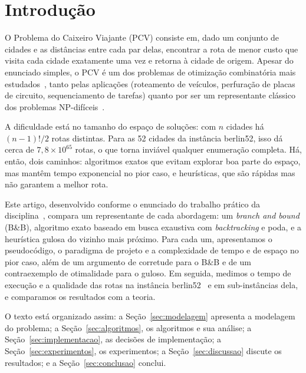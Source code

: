 \documentclass[12pt,a4paper]{article}
\begin{document}
\section{Introdução}

O Problema do Caixeiro Viajante (PCV) consiste em, dado um conjunto de cidades e as distâncias entre cada par delas, encontrar a rota de menor custo que visita cada cidade exatamente uma vez e retorna à cidade de origem. Apesar do enunciado simples, o PCV é um dos problemas de otimização combinatória mais estudados~\cite{applegate2006}, tanto pelas aplicações (roteamento de veículos, perfuração de placas de circuito, sequenciamento de tarefas) quanto por ser um representante clássico dos problemas NP-difíceis~\cite{karp1972,garey1979}.

A dificuldade está no tamanho do espaço de soluções: com $n$ cidades há $(n-1)!/2$ rotas distintas. Para as 52 cidades da instância berlin52, isso dá cerca de $7{,}8 \times 10^{65}$ rotas, o que torna inviável qualquer enumeração completa. Há, então, dois caminhos: algoritmos exatos que evitam explorar boa parte do espaço, mas mantêm tempo exponencial no pior caso, e heurísticas, que são rápidas mas não garantem a melhor rota.

Este artigo, desenvolvido conforme o enunciado do trabalho prático da disciplina~\cite{enunciado}, compara um representante de cada abordagem: um \emph{branch and bound} (B\&B), algoritmo exato baseado em busca exaustiva com \emph{backtracking} e poda, e a heurística gulosa do vizinho mais próximo. Para cada um, apresentamos o pseudocódigo, o paradigma de projeto e a complexidade de tempo e de espaço no pior caso, além de um argumento de corretude para o B\&B e de um contraexemplo de otimalidade para o guloso. Em seguida, medimos o tempo de execução e a qualidade das rotas na instância berlin52~\cite{reinelt1991} e em sub-instâncias dela, e comparamos os resultados com a teoria.

O texto está organizado assim: a Seção~\ref{sec:modelagem} apresenta a modelagem do problema; a Seção~\ref{sec:algoritmos}, os algoritmos e sua análise; a Seção~\ref{sec:implementacao}, as decisões de implementação; a Seção~\ref{sec:experimentos}, os experimentos; a Seção~\ref{sec:discussao} discute os resultados; e a Seção~\ref{sec:conclusao} conclui.

\end{document}
